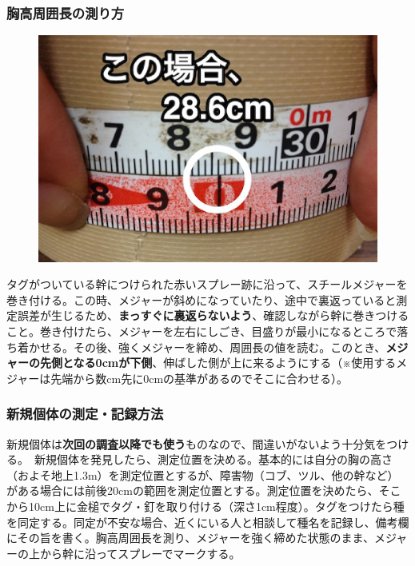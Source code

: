 \documentclass[12pt,a4paper]{extarticle}
\begin{document}
\newpage
\begin{mdframed}[style=exampledefault,roundcorner=5]\small{
\subsubsection*{胸高周囲長の測り方}

\begin{figure}
\includegraphics[scale=0.24]{../Images/measure.eps}
\end{figure}


タグがついている幹につけられた赤いスプレー跡に沿って、スチールメジャーを巻き付ける。この時、メジャーが斜めになっていたり、途中で裏返っていると測定誤差が生じるため、\textbf{まっすぐに裏返らないよう}、確認しながら幹に巻きつけること。巻き付けたら、メジャーを左右にしごき、目盛りが最小になるところで落ち着かせる。その後、強くメジャーを締め、周囲長の値を読む。このとき、\textbf{メジャーの先側となる0cmが下側}、伸ばした側が上に来るようにする（※使用するメジャーは先端から数cm先に0cmの基準があるのでそこに合わせる）。

}\end{mdframed}

\begin{mdframed}[style=exampledefault,roundcorner=5]\small{
\subsubsection*{新規個体の測定・記録方法}

新規個体は\textbf{次回の調査以降でも使う}ものなので、間違いがないよう十分気をつける。　新規個体を発見したら、測定位置を決める。基本的には自分の胸の高さ（およそ地上1.3m）を測定位置とするが、障害物（コブ、ツル、他の幹など）がある場合には前後20cmの範囲を測定位置とする。測定位置を決めたら、そこから10cm上に金槌でタグ・釘を取り付ける（深さ1cm程度）。タグをつけたら種を同定する。同定が不安な場合、近くにいる人と相談して種名を記録し、備考欄にその旨を書く。胸高周囲長を測り、メジャーを強く締めた状態のまま、メジャーの上から幹に沿ってスプレーでマークする。

}\end{mdframed}
\end{document}
